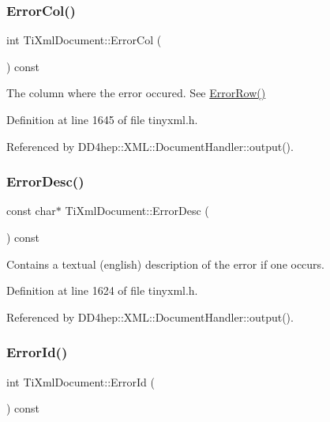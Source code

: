 \subsubsection{\texorpdfstring{Error\+Col()}{ErrorCol()}}
{\footnotesize\ttfamily int Ti\+Xml\+Document\+::\+Error\+Col (\begin{DoxyParamCaption}{ }\end{DoxyParamCaption}) const\hspace{0.3cm}{\ttfamily [inline]}}



The column where the error occured. See \hyperlink{class_ti_xml_document_a062e5257128a7da31b0b2e38cd524600}{Error\+Row()} 



Definition at line 1645 of file tinyxml.\+h.



Referenced by D\+D4hep\+::\+X\+M\+L\+::\+Document\+Handler\+::output().

\hypertarget{class_ti_xml_document_aab511be262e84a003e3bb86f0215c8c2}{}\label{class_ti_xml_document_aab511be262e84a003e3bb86f0215c8c2} 
\subsubsection{\texorpdfstring{Error\+Desc()}{ErrorDesc()}}
{\footnotesize\ttfamily const char$\ast$ Ti\+Xml\+Document\+::\+Error\+Desc (\begin{DoxyParamCaption}{ }\end{DoxyParamCaption}) const\hspace{0.3cm}{\ttfamily [inline]}}



Contains a textual (english) description of the error if one occurs. 



Definition at line 1624 of file tinyxml.\+h.



Referenced by D\+D4hep\+::\+X\+M\+L\+::\+Document\+Handler\+::output().

\hypertarget{class_ti_xml_document_abd928b49a646c8ed53e0453c555d96a2}{}\label{class_ti_xml_document_abd928b49a646c8ed53e0453c555d96a2} 
\subsubsection{\texorpdfstring{Error\+Id()}{ErrorId()}}
{\footnotesize\ttfamily int Ti\+Xml\+Document\+::\+Error\+Id (\begin{DoxyParamCaption}{ }\end{DoxyParamCaption}) const\hspace{0.3cm}{\ttfamily [inline]}}


